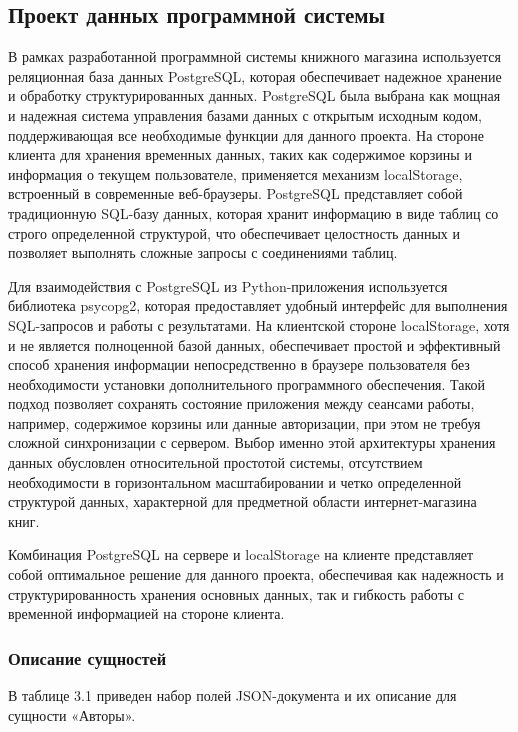 \subsection{Проект данных программной системы}

В рамках разработанной программной системы книжного магазина используется реляционная база данных PostgreSQL, которая обеспечивает надежное хранение и обработку структурированных данных. PostgreSQL была выбрана как мощная и надежная система управления базами данных с открытым исходным кодом, поддерживающая все необходимые функции для данного проекта. На стороне клиента для хранения временных данных, таких как содержимое корзины и информация о текущем пользователе, применяется механизм localStorage, встроенный в современные веб-браузеры. PostgreSQL представляет собой традиционную SQL-базу данных, которая хранит информацию в виде таблиц со строго определенной структурой, что обеспечивает целостность данных и позволяет выполнять сложные запросы с соединениями таблиц.

Для взаимодействия с PostgreSQL из Python-приложения используется библиотека psycopg2, которая предоставляет удобный интерфейс для выполнения SQL-запросов и работы с результатами. На клиентской стороне localStorage, хотя и не является полноценной базой данных, обеспечивает простой и эффективный способ хранения информации непосредственно в браузере пользователя без необходимости установки дополнительного программного обеспечения. Такой подход позволяет сохранять состояние приложения между сеансами работы, например, содержимое корзины или данные авторизации, при этом не требуя сложной синхронизации с сервером. Выбор именно этой архитектуры хранения данных обусловлен относительной простотой системы, отсутствием необходимости в горизонтальном масштабировании и четко определенной структурой данных, характерной для предметной области интернет-магазина книг.

Комбинация PostgreSQL на сервере и localStorage на клиенте представляет собой оптимальное решение для данного проекта, обеспечивая как надежность и структурированность хранения основных данных, так и гибкость работы с временной информацией на стороне клиента.

\subsubsection{Описание сущностей}

 В таблице 3.1 приведен набор полей JSON-документа и их описание для сущности «Авторы».

